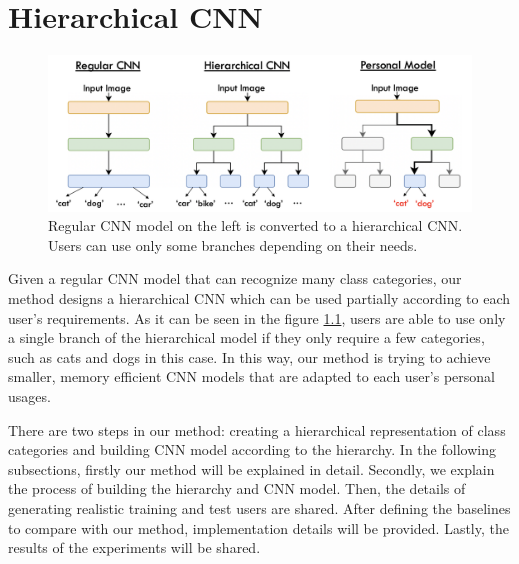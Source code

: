 
\lhead[\chaptername~\thechapter]{\rightmark}

\rhead[\leftmark]{}

\lfoot[\thepage]{}

\cfoot{}

\rfoot[]{\thepage}

\chapter{Hierarchical CNN}
\label{HierCNN}

\begin{figure}
    \centering
    \includegraphics[width=\textwidth]{thesis/images/hierarchical-cnn-fig.png}
    \caption{Regular CNN model on the left is converted to a hierarchical CNN. Users can use only some branches depending on their needs.}
    \label{fig:hiermethodoverview}
\end{figure}

Given a regular CNN model that can recognize many class categories, our method designs a hierarchical CNN which can be used partially according to each user's requirements. 
As it can be seen in the figure \ref{fig:hiermethodoverview}, users are able to use only a single branch of the hierarchical model if they only require a few categories, such as cats and dogs in this case. 
In this way, our method is trying to achieve smaller, memory efficient CNN models that are adapted to each user's personal usages.

There are two steps in our method: creating a hierarchical representation of class categories and building CNN model according to the hierarchy.
In the following subsections, firstly our method will be explained in detail.
Secondly, we explain the process of building the hierarchy and CNN model. 
Then, the details of generating realistic training and test users are shared.
After defining the baselines to compare with our method, implementation details will be provided.
Lastly, the results of the experiments will be shared.

